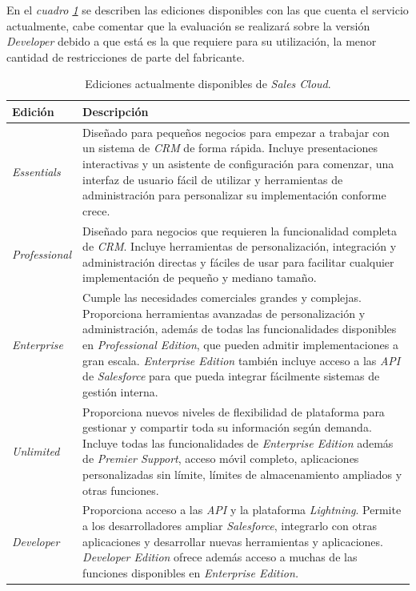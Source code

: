 En el \emph{cuadro \ref{ediciones}} se describen las ediciones disponibles con
las que cuenta el servicio actualmente, cabe comentar que la evaluación se
realizará sobre la versión \emph{Developer} debido a que está es la que requiere
para su utilización, la menor cantidad de restricciones de parte del fabricante.

\begin{table}
\centering
\begin{tabular}{|l|p{12.0cm}|}
\hline
\footnotesize{\textbf{Edición}} & \footnotesize{\textbf{Descripción}} \\
\hline
\footnotesize{\emph{Essentials}} & \footnotesize{Diseñado para pequeños negocios
para empezar a trabajar con un sistema de \emph{CRM} de forma rápida. Incluye
presentaciones interactivas y un asistente de configuración para comenzar, una
interfaz de usuario fácil de utilizar y herramientas de administración para
personalizar su implementación conforme crece.} \\
\footnotesize{\emph{Professional}} & \footnotesize{Diseñado para negocios que
requieren la funcionalidad completa de \emph{CRM}. Incluye herramientas de
personalización, integración y administración directas y fáciles de usar para
facilitar cualquier implementación de pequeño y mediano tamaño.} \\
\footnotesize{\emph{Enterprise}} & \footnotesize{Cumple las necesidades
comerciales grandes y complejas. Proporciona herramientas avanzadas de
personalización y administración, además de todas las funcionalidades
disponibles en \emph{Professional Edition}, que pueden admitir implementaciones
a gran escala. \emph{Enterprise Edition} también incluye acceso a las \emph{API}
de \emph{Salesforce} para que pueda integrar fácilmente sistemas de gestión
interna.} \\
\footnotesize{\emph{Unlimited}} & \footnotesize{Proporciona nuevos niveles de
flexibilidad de plataforma para gestionar y compartir toda su información según
demanda. Incluye todas las funcionalidades de \emph{Enterprise Edition} además
de \emph{Premier Support}, acceso móvil completo, aplicaciones personalizadas
sin límite, límites de almacenamiento ampliados y otras funciones.} \\
\footnotesize{\emph{Developer}} & \footnotesize{Proporciona acceso a las
\emph{API} y la plataforma \emph{Lightning}. Permite a los desarrolladores
ampliar \emph{Salesforce}, integrarlo con otras aplicaciones y desarrollar
nuevas herramientas y aplicaciones. \emph{Developer Edition} ofrece además
acceso a muchas de las funciones disponibles en \emph{Enterprise Edition.}} \\
\hline
\end{tabular}
\caption{Ediciones actualmente disponibles de \emph{Sales Cloud}.}
\label{ediciones}
\end{table}

